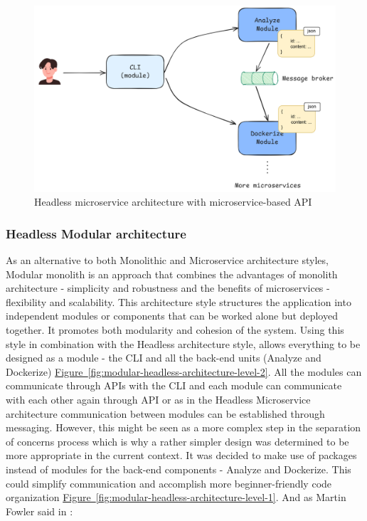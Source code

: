 \documentclass[twocolumn]{article}
\newcommand{\FigRef}[1]{\hyperref[#1]{Figure~\ref{#1}}}
\begin{document}
\begin{figure}[H]
    \centering
    \includegraphics[width=\linewidth]{images/headless-microservice-architecture.png}
    \caption{Headless microservice architecture with microservice-based API}
    \label{fig:headless-microservice-architecture}
\end{figure}

\subsubsection{Headless Modular architecture}
As an alternative to both Monolithic and Microservice architecture styles, Modular monolith is an approach that combines the advantages of monolith architecture - simplicity and robustness and the benefits of microservices - flexibility and scalability. This architecture style structures the application into independent modules or components that can be worked alone but deployed together. It promotes both modularity and cohesion of the system. Using this style in combination with the Headless architecture style, allows everything to be designed as a module - the CLI and all the back-end units (Analyze and Dockerize) \FigRef{fig:modular-headless-architecture-level-2}. All the modules can communicate through APIs with the CLI and each module can communicate with each other again through API or as in the Headless Microservice architecture communication between modules can be established through messaging. However, this might be seen as a more complex step in the separation of concerns process which is why a rather simpler design was determined to be more appropriate in the current context. It was decided to make use of packages instead of modules for the back-end components - Analyze and Dockerize. This could simplify communication and accomplish more beginner-friendly code organization \FigRef{fig:modular-headless-architecture-level-1}.
And as Martin Fowler said in \cite{Fowler-2015}: 
\end{document}
